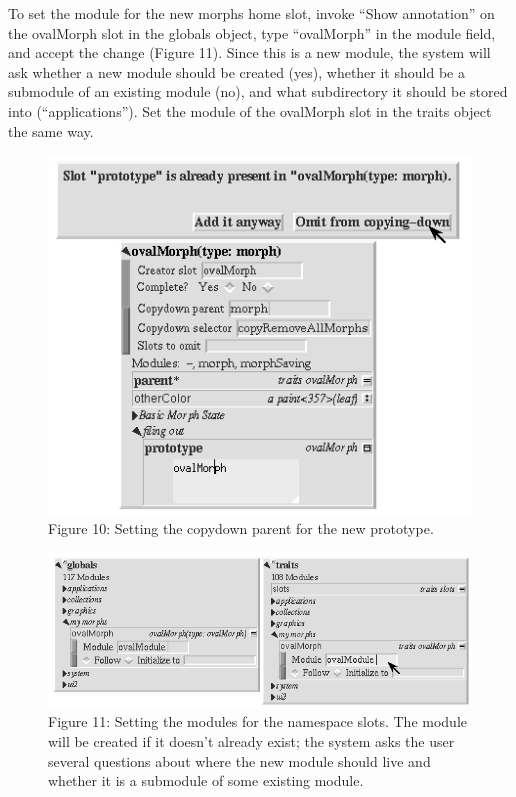\documentclass[letterpaper,10pt,english]{sphinxmanual}
\begin{document}
To set the module for the new morphs home slot, invoke ``Show annotation'' on the ovalMorph slot in the globals object, type ``ovalMorph'' in the module field, and accept the change (Figure 11). Since this is a new module, the system will ask whether a new module should be created (yes), whether it should be a submodule of an existing module (no), and what subdirectory it should be stored into (``applications''). Set the module of the ovalMorph slot in the traits object the same way.
\begin{figure}[htbp]\begin{flushleft}
\capstart

\includegraphics{Figure10.png}
\caption{Figure 10: Setting the copydown parent for the new prototype.}\end{flushleft}\end{figure}
\begin{figure}[htbp]\begin{flushleft}
\capstart

\includegraphics{Figure11.png}
\caption{Figure 11: Setting the modules for the namespace slots. The module will be created if it doesn't already exist; the system asks the user several questions about where the new module should live and whether it is a submodule of some existing module.}\end{flushleft}\end{figure}
\end{document}
